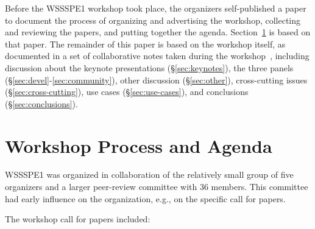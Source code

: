 \documentclass[11pt, oneside]{amsart}
\begin{document}
Before the WSSSPE1 workshop took place, the organizers self-published
a paper~\cite{WSSSPE1-pre-report} to document the process of
organizing and advertising the workshop, collecting and reviewing the
papers, and putting together the agenda.  Section~\ref{sec:process} is
based on that paper. The remainder of this paper is based on the
workshop itself, as documented in a set of collaborative notes taken
during the workshop~\cite{WSSSPE1-google-notes}, including discussion
about the keynote presentations (\S\ref{sec:keynotes}), the three
panels (\S\ref{sec:devel}-\ref{sec:community}), other discussion
(\S\ref{sec:other}), cross-cutting issues (\S\ref{sec:cross-cutting}),
use cases (\S\ref{sec:use-cases}), and conclusions
(\S\ref{sec:conclusions}).
 
\section{Workshop Process and Agenda} \label{sec:process}

WSSSPE1 was organized in collaboration of the relatively small group
of five organizers and a larger peer-review committee with 36
members. This committee had early influence on the organization, e.g.,
on the specific call for papers.

The workshop call for papers included:
\end{document}
